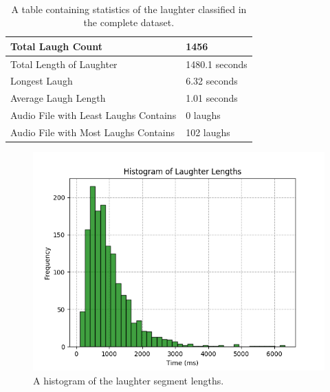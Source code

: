 \documentclass[a4paper,11pt,notitlepage]{article}
\begin{document}
\\ 
\begin{table}[]
\centering
\begin{tabular}{|l|l|}
\hline
Total Laugh Count                     & 1456           \\ \hline
Total Length of Laughter              & 1480.1 seconds \\ \hline
Longest Laugh                         & 6.32 seconds   \\ \hline
Average Laugh Length                  & 1.01 seconds   \\ \hline
Audio File with Least Laughs Contains & 0 laughs       \\ \hline
Audio File with Most Laughs Contains  & 102 laughs     \\ \hline
\end{tabular}
\caption{A table containing statistics of the laughter classified in the complete dataset.}
\label{laughter_stats_table}
\end{table}

\begin{figure}[H]
	\centering
	\vspace{0.5cm}
	\includegraphics[scale = 0.8]{figs/laughter_length_histogram.png}
	\caption{A histogram of the laughter segment lengths.}
	\label{laughter_length_histogram}
\end{figure}
\end{document}
